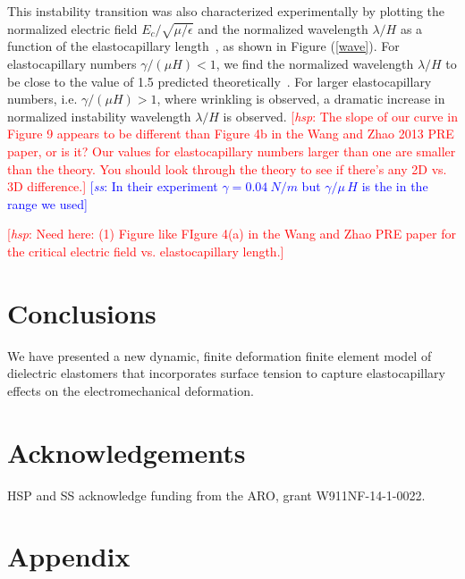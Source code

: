 \documentclass[final,authoryear,3p,times,twocolumn]{elsarticle}
\newcommand{\hsp}[1]{\textcolor{red}{[\textit{hsp}: #1]}}
\newcommand{\sss}[1]{\textcolor{blue}{[\textit{ss}: #1]}}
\begin{document}
This instability transition was also characterized experimentally by plotting the normalized electric field $E_{c}/\sqrt{\mu/\epsilon}$ and the normalized wavelength $\lambda/H$ as a function of the elastocapillary length~\cite{wangPRE2013}, as shown in Figure (\ref{wave}).  For elastocapillary numbers $\gamma/(\mu H)<1$, we find the normalized wavelength $\lambda/H$ to be close to the value of 1.5 predicted theoretically~\cite{wangPRE2013}.  For larger elastocapillary numbers, i.e. $\gamma/(\mu H)>1$, where wrinkling is observed, a dramatic increase in normalized instability wavelength $\lambda/H$ is observed.  \hsp{The slope of our curve in Figure 9 appears to be different than Figure 4b in the Wang and Zhao 2013 PRE paper, or is it?  Our values for elastocapillary numbers larger than one are smaller than the theory.  You should look through the theory to see if there's any 2D vs. 3D difference.} \sss{In their experiment $\gamma=0.04\ N/m$ but $\gamma/\mu\,H$ is the in the range we used}


\hsp{Need here:  (1) Figure like FIgure 4(a) in the Wang and Zhao PRE paper for the critical electric field vs. elastocapillary length.}

\section{Conclusions}

We have presented a new dynamic, finite deformation finite element model of dielectric elastomers that incorporates surface tension to capture elastocapillary effects on the electromechanical deformation.  

\section{Acknowledgements}

HSP and SS acknowledge funding from the ARO, grant W911NF-14-1-0022.

\section{Appendix}
\end{document}
